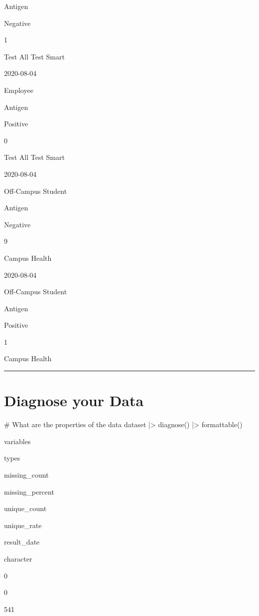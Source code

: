 \documentclass[
  letterpaper,
  DIV=11,
  numbers=noendperiod]{scrreprt}
\newenvironment{Shaded}{\begin{snugshade}}{\end{snugshade}}
\newcommand{\CommentTok}[1]{\textcolor[rgb]{0.37,0.37,0.37}{#1}}
\newcommand{\FunctionTok}[1]{\textcolor[rgb]{0.28,0.35,0.67}{#1}}
\newcommand{\NormalTok}[1]{\textcolor[rgb]{0.00,0.23,0.31}{#1}}
\newcommand{\SpecialCharTok}[1]{\textcolor[rgb]{0.37,0.37,0.37}{#1}}
\begin{document}
Antigen

Negative

1

Test All Test Smart

2020-08-04

Employee

Antigen

Positive

0

Test All Test Smart

2020-08-04

Off-Campus Student

Antigen

Negative

9

Campus Health

2020-08-04

Off-Campus Student

Antigen

Positive

1

Campus Health

\begin{center}\rule{0.5\linewidth}{0.5pt}\end{center}

\hypertarget{diagnose-your-data}{%
\section{Diagnose your Data}\label{diagnose-your-data}}

\begin{Shaded}
\begin{Highlighting}[]
\CommentTok{\# What are the properties of the data}
\NormalTok{dataset }\SpecialCharTok{|\textgreater{}}
  \FunctionTok{diagnose}\NormalTok{() }\SpecialCharTok{|\textgreater{}}
  \FunctionTok{formattable}\NormalTok{()}
\end{Highlighting}
\end{Shaded}

variables

types

missing\_count

missing\_percent

unique\_count

unique\_rate

result\_date

character

0

0

541
\end{document}
